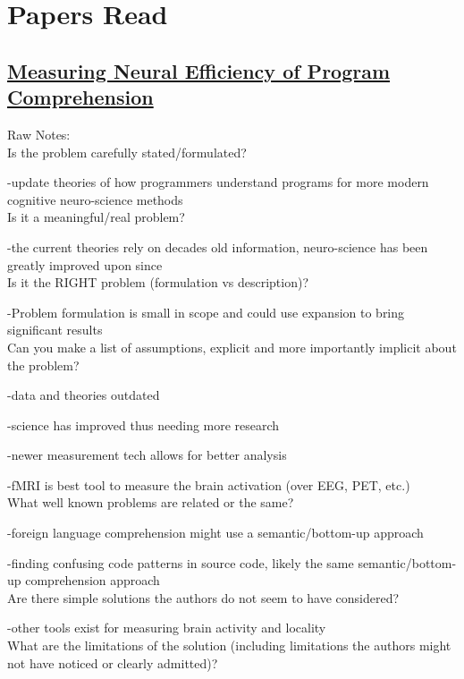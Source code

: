 \documentclass{IEEEtran}
\begin{document}
\section{Papers Read}
\subsection{\underline{Measuring Neural Efficiency of Program Comprehension}\cite{siegmund_measuring_2017}}
Raw Notes:
\\

Is the problem carefully stated/formulated?

-update theories of how programmers understand programs for more modern cognitive neuro-science methods
\\

Is it a meaningful/real problem?

-the current theories rely on decades old information, neuro-science has been greatly improved upon since
\\

Is it the RIGHT problem (formulation vs description)?

-Problem formulation is small in scope and could use expansion to bring significant results
\\

Can you make a list of assumptions, explicit and more importantly implicit about the problem?

-data and theories outdated

-science has improved thus needing more research

-newer measurement tech allows for better analysis

-fMRI is best tool to measure the brain activation (over EEG, PET, etc.)
\\

What well known problems are related or the same? 

-foreign language comprehension might use a semantic/bottom-up approach

-finding confusing code patterns in source code, likely the same semantic/bottom-up comprehension approach
\\

Are there simple solutions the authors do not seem to have considered?

-other tools exist for measuring brain activity and locality
\\

What are the limitations of the solution (including limitations the authors might not have noticed or clearly 
admitted)?
\end{document}
